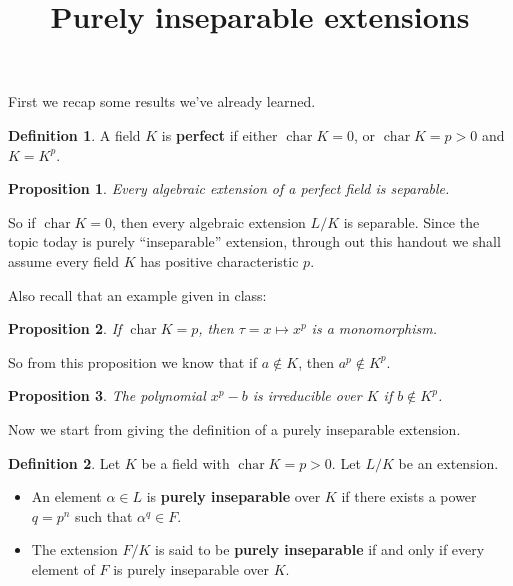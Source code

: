 \documentclass[a4paper]{article}
\title{Purely inseparable extensions}
\date{}
\DeclareMathOperator{\Char}{char}
\theoremstyle{remark}
\theoremstyle{definition}
\theoremstyle{definition}
\newtheorem{definition}{Definition}
\theoremstyle{plain}
\newtheorem{proposition}{Proposition}
\begin{document}
  \maketitle
  \vspace*{-2.5cm}

  First we recap some results we've already learned.
  \begin{definition}
    A field $K$ is {\bf perfect} if either $\Char K = 0$, or $\Char K = p > 0$ and $K = K^p$.
  \end{definition}

  \begin{proposition}
    Every algebraic extension of a perfect field is separable.
  \end{proposition}


  So if $\Char K = 0$, then every algebraic extension $L/K$ is separable.
  Since the topic today is purely ``inseparable'' extension, through out this handout
  we shall assume every field $K$ has positive characteristic $p$.

  Also recall that an example given in class:

  \begin{proposition} \label{prop:p-power-is-mono}
    If $\Char K = p$, then $\tau = x \mapsto x^p$ is a monomorphism.
  \end{proposition}

  So from this proposition we know that if $a \not\in K$, then $a^p \not\in K^p$.

  \begin{proposition}
    The polynomial $x^p - b$ is irreducible over $K$ if $b \not\in K^p$.
  \end{proposition}


  Now we start from giving the definition of a purely inseparable extension.

  \begin{definition}
    Let $K$ be a field with $\Char K = p > 0$. Let $L/K$ be an extension.

    \begin{itemize}
      \item An element $\alpha \in L$ is {\bf purely inseparable} over $K$ if
        there exists a power $q = p^n$ such that $\alpha^q \in F$.
      \item The extension $F/K$ is said to be {\bf purely inseparable} if and only if
        every element of $F$ is purely inseparable over $K$.
    \end{itemize}
  \end{definition}
\end{document}
